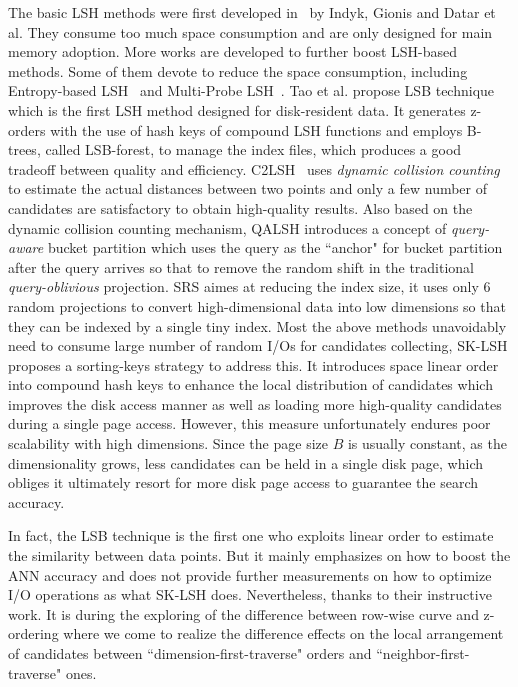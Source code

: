 \documentclass[twocolumn]{svjour3}          %
\begin{document}
The basic LSH methods were first developed in~\cite{Indyk1998LSH,Gionis1999,Datar2004} by Indyk, Gionis and Datar et al. They consume too much space consumption and are only designed for main memory adoption. More works are developed to further boost LSH-based methods.
Some of them devote to reduce the space consumption, including Entropy-based LSH~\cite{Panigrahy2006} and Multi-Probe LSH~\cite{Lv2007,Joly2008}. 
Tao et al. propose LSB technique~\cite{Tao2009LSB} which is the first LSH method designed for disk-resident data. It generates z-orders with the use of hash keys of compound LSH functions and employs B-trees, called LSB-forest, to manage the index files, which produces a good tradeoff between quality and efficiency. C2LSH~\cite{Gan2012C2LSH} uses \emph{dynamic collision counting} to estimate the actual distances between two points and only a few number of candidates are satisfactory to obtain high-quality results.
Also based on the dynamic collision counting mechanism, QALSH introduces a concept of \emph{query-aware} bucket partition which uses the query as the ``anchor" for bucket partition after the query arrives so that to remove the random shift in the traditional \emph{query-oblivious} projection.
SRS aimes at reducing the index size, it uses only 6 random projections to convert high-dimensional data into low dimensions so that they can be indexed by a single tiny index.
Most the above methods unavoidably need to consume large number of random I/Os for candidates collecting, SK-LSH proposes a sorting-keys strategy to address this. It introduces space linear order into compound hash keys to enhance the local distribution of candidates which improves the disk access manner as well as loading more high-quality candidates during a single page access. However, this measure unfortunately endures poor scalability with high dimensions. Since the page size $B$ is usually constant, as the dimensionality grows, less candidates can be held in a single disk page, which obliges it ultimately resort for more disk page access to guarantee the search accuracy.

In fact, the LSB technique is the first one who exploits linear order to estimate the similarity between data points. But it mainly emphasizes on how to boost the ANN accuracy and does not provide further measurements on how to optimize I/O operations as what SK-LSH does. Nevertheless, thanks to their instructive work. It is during the exploring of the difference between row-wise curve and z-ordering where we come to realize the difference effects on the local arrangement of candidates between ``dimension-first-traverse" orders and ``neighbor-first-traverse" ones.
\end{document}
